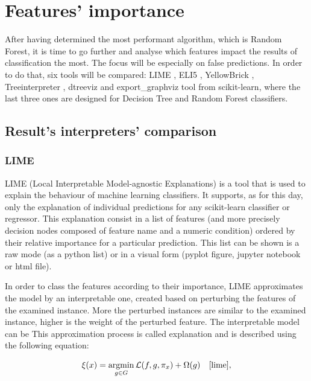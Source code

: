 \chapter{Features' importance}

After having determined the most performant algorithm, which is Random Forest, it is time to go further and analyse which features impact the results of classification the most. The focus will be especially on false predictions. In order to do that, six tools will be compared: LIME \cite{lime}, ELI5 \cite{mikhail_korobov_eli5_nodate}, YellowBrick \cite{bengfort_yellowbrick_2018}, Treeinterpreter \cite{ando_saabas_treeinterpreter_nodate}, dtreeviz \cite{terence_parr_dtreeviz_nodate} and export\_graphviz tool from scikit-learn, where the last three ones are designed for Decision Tree and Random Forest classifiers.

\section{Result's interpreters' comparison}
\subsection{LIME} 
LIME (Local Interpretable Model-agnostic Explanations) is a tool that is used to explain the behaviour of machine learning classifiers. It supports, as for this day, only the explanation of individual predictions for any scikit-learn classifier or regressor. This explanation consist in a list of features (and more precisely decision nodes composed of feature name and a numeric condition) ordered by their relative importance for a particular prediction. This list can be shown is a raw mode (as a python list) or in a visual form (pyplot figure, jupyter notebook or html file).

In order to class the features according to their importance, LIME approximates the model by an interpretable one, created based on perturbing the features of the examined instance. More the perturbed instances are similar to the examined instance, higher is the weight of the perturbed feature. The interpretable model can be This approximation process is called explanation and is described using the following equation:

\begin{equation}
    \xi(x) = \operatorname*{argmin}_{g \in G} \mathcal{L}(f, g, \pi_x) + \Omega(g)\quad\cite{lime},
\end{equation}

